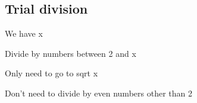 
\subsection{Trial division}

We have x

Divide by numbers between 2 and x

Only need to go to sqrt x

Don't need to divide by even numbers other than 2

